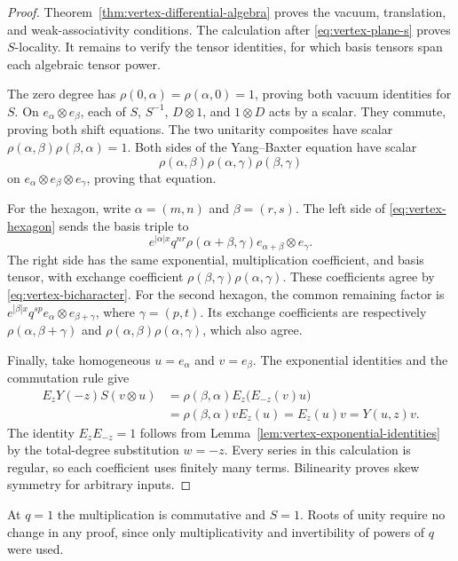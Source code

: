 \begin{proof}
Theorem~\ref{thm:vertex-differential-algebra} proves the vacuum,
translation, and weak-associativity conditions.
The calculation after \eqref{eq:vertex-plane-s} proves $S$-locality.
It remains to verify the tensor identities, for which basis tensors
span each algebraic tensor power.

The zero degree has $\rho(0,\alpha)=\rho(\alpha,0)=1$, proving
both vacuum identities for $S$.
On $e_\alpha\otimes e_\beta$, each of $S$, $S^{-1}$, $D\otimes1$,
and $1\otimes D$ acts by a scalar.
They commute, proving both shift equations.
The two unitarity composites have scalar
$\rho(\alpha,\beta)\rho(\beta,\alpha)=1$.
Both sides of the Yang--Baxter equation have scalar
\[
 \rho(\alpha,\beta)\rho(\alpha,\gamma)\rho(\beta,\gamma)
\]
on $e_\alpha\otimes e_\beta\otimes e_\gamma$, proving that equation.

For the hexagon, write $\alpha=(m,n)$ and $\beta=(r,s)$.
The left side of \eqref{eq:vertex-hexagon} sends the basis triple to
\[
 e^{|\alpha|x}q^{nr}\rho(\alpha+\beta,\gamma)
    e_{\alpha+\beta}\otimes e_\gamma.
\]
The right side has the same exponential, multiplication coefficient,
and basis tensor, with exchange coefficient
$\rho(\beta,\gamma)\rho(\alpha,\gamma)$.
These coefficients agree by \eqref{eq:vertex-bicharacter}.
For the second hexagon, the common remaining factor is
$e^{|\beta|x}q^{sp}e_\alpha\otimes e_{\beta+\gamma}$,
where $\gamma=(p,t)$.
Its exchange coefficients are respectively $\rho(\alpha,\beta+\gamma)$
and $\rho(\alpha,\beta)\rho(\alpha,\gamma)$, which also agree.

Finally, take homogeneous $u=e_\alpha$ and $v=e_\beta$.
The exponential identities and the commutation rule give
\[
 \begin{aligned}
 E_zY(-z)S(v\otimes u)
   &=\rho(\beta,\alpha)E_z\bigl(E_{-z}(v)u\bigr)\\
   &=\rho(\beta,\alpha)vE_z(u)
     =E_z(u)v=Y(u,z)v.
 \end{aligned}
\]
The identity $E_zE_{-z}=1$ follows from
Lemma~\ref{lem:vertex-exponential-identities} by the total-degree
substitution $w=-z$.
Every series in this calculation is regular, so each coefficient
uses finitely many terms.
Bilinearity proves skew symmetry for arbitrary inputs.
\end{proof}

At $q=1$ the multiplication is commutative and $S=1$.
Roots of unity require no change in any proof, since only
multiplicativity and invertibility of powers of $q$ were used.

